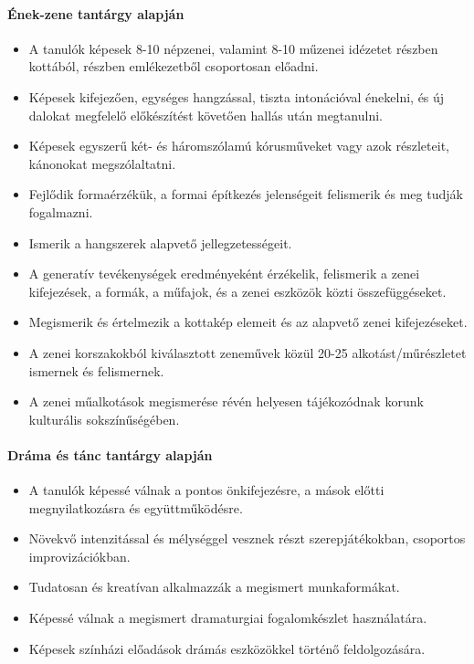 \paragraph{Ének-zene tantárgy alapján}
\begin{itemize}
\item A tanulók képesek 8-10 népzenei, valamint 8-10 műzenei idézetet részben kottából, részben emlékezetből csoportosan előadni.
\item Képesek kifejezően, egységes hangzással, tiszta intonációval énekelni, és új dalokat megfelelő előkészítést követően hallás után megtanulni.
\item Képesek egyszerű két- és háromszólamú kórusműveket vagy azok részleteit, kánonokat megszólaltatni.
\item Fejlődik formaérzékük, a formai építkezés jelenségeit felismerik és meg tudják fogalmazni.
\item Ismerik a hangszerek alapvető jellegzetességeit.
\item A generatív tevékenységek eredményeként érzékelik, felismerik a zenei kifejezések, a formák, a műfajok, és a zenei eszközök közti összefüggéseket.
\item Megismerik és értelmezik a kottakép elemeit és az alapvető zenei kifejezéseket.
\item A zenei korszakokból kiválasztott zeneművek közül 20-25 alkotást/műrészletet ismernek és felismernek.
\item A zenei műalkotások megismerése révén helyesen tájékozódnak korunk kulturális sokszínűségében.
\end{itemize}
\paragraph{Dráma és tánc tantárgy alapján}
\begin{itemize}
\item A tanulók képessé válnak a pontos önkifejezésre, a mások előtti megnyilatkozásra és együttműködésre.
\item Növekvő intenzitással és mélységgel vesznek részt szerepjátékokban, csoportos improvizációkban.
\item Tudatosan és kreatívan alkalmazzák a megismert munkaformákat.
\item Képessé válnak a megismert dramaturgiai fogalomkészlet használatára.
\item Képesek színházi előadások drámás eszközökkel történő feldolgozására.
\end{itemize}
